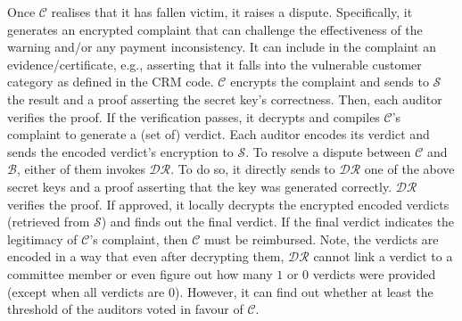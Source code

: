 

Once $\mathcal{C}$ realises that it has fallen victim, it raises a dispute. Specifically, it generates an encrypted complaint that can challenge the effectiveness of the warning and/or any payment inconsistency. It can include in the complaint an evidence/certificate, e.g., asserting that it falls into the vulnerable customer category as defined in the CRM code. $\mathcal{C}$ encrypts the complaint and sends to $\mathcal{S}$ the result and a proof asserting the secret key's correctness.  Then, each auditor verifies the proof. If the verification passes, it decrypts and compiles $\mathcal{C}$'s complaint to generate a (set of) verdict. Each auditor encodes its verdict and sends the encoded verdict's encryption to $\mathcal{S}$. To resolve a dispute between $\mathcal{C}$ and $\mathcal{B}$, either of them invokes $\mathcal{DR}$. To do so, it directly sends to $\mathcal{DR}$ one of the above secret keys and a proof asserting that the key was generated correctly.   $\mathcal{DR}$ verifies the proof. If approved, it locally decrypts the encrypted encoded verdicts (retrieved from $\mathcal{S}$) and finds out the final verdict.  If the final verdict indicates the legitimacy of  $\mathcal{C}$'s complaint, then $\mathcal{C}$ must be reimbursed.   Note, the verdicts are encoded in a way that even after decrypting them, $\mathcal{DR}$ cannot link a verdict to a committee member or even figure out how many $1$ or $0$ verdicts were provided  (except when all verdicts are $0$). However, it can find out whether at least the threshold of the auditors voted in favour of $\mathcal{C}$. %










